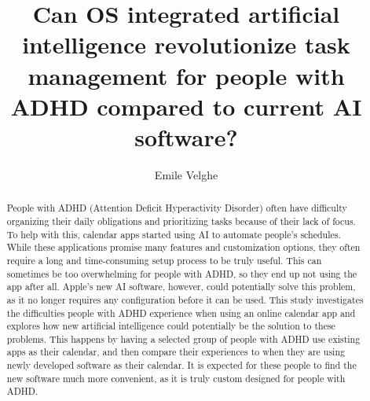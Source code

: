 \documentclass[english]{hogent-article}
\title{Can OS integrated artificial intelligence revolutionize task management for people with ADHD compared to current AI software?}
\author{Emile Velghe}
\begin{document}
\begin{abstract}
  People with ADHD (Attention Deficit Hyperactivity Disorder) often have difficulty organizing their daily obligations and prioritizing tasks because of their lack of focus. To help with this, calendar apps started using AI to automate people’s schedules. While these applications promise many features and customization options, they often require a long and time-consuming setup process to be truly useful. This can sometimes be too overwhelming for people with ADHD, so they end up not using the app after all. Apple's new AI software, however, could potentially solve this problem, as it no longer requires any configuration before it can be used. This study investigates the difficulties people with ADHD experience when using an online calendar app and explores how new artificial intelligence could potentially be the solution to these problems. This happens by having a selected group of people with ADHD use existing apps as their calendar, and then compare their experiences to when they are using newly developed software as their calendar. It is expected for these people to find the new software much more convenient, as it is truly custom designed for people with ADHD. 
\end{abstract}

\tableofcontents

\bigskip

%
%
%

% 
%
%
%
\end{document}
